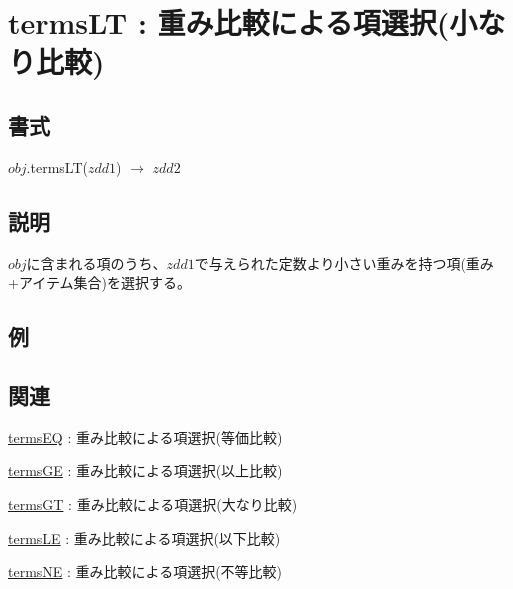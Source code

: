 
\section{termsLT : 重み比較による項選択(小なり比較)\label{sect:termsLT}}
\subsection*{書式}
$obj$.termsLT($zdd1$) $\rightarrow$ $zdd2$

\subsection*{説明}
$obj$に含まれる項のうち、$zdd1$で与えられた定数より小さい重みを持つ項(重み+アイテム集合)を選択する。

\subsection*{例}


\subsection*{関連}
\hyperref[sect:termsEQ]{termsEQ} : 重み比較による項選択(等価比較)

\hyperref[sect:termsGE]{termsGE} : 重み比較による項選択(以上比較)

\hyperref[sect:termsGT]{termsGT} : 重み比較による項選択(大なり比較)

\hyperref[sect:termsLE]{termsLE} : 重み比較による項選択(以下比較)

\hyperref[sect:termsNE]{termsNE} : 重み比較による項選択(不等比較)

